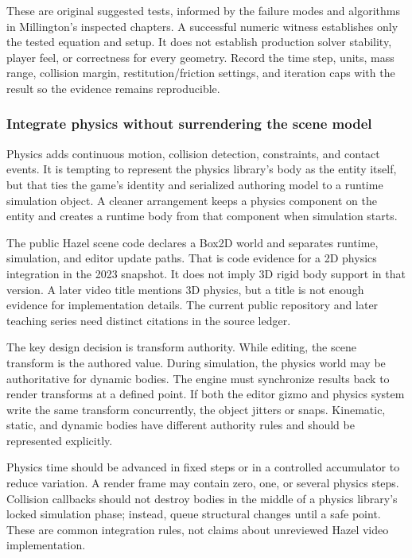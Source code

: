 These are original suggested tests, informed by the failure modes and algorithms in Millington's inspected chapters. A successful numeric witness establishes only the tested equation and setup. It does not establish production solver stability, player feel, or correctness for every geometry. Record the time step, units, mass range, collision margin, restitution/friction settings, and iteration caps with the result so the evidence remains reproducible.

\subsubsection{Integrate physics without surrendering the scene model}\label{integrate-physics-without-surrendering-the-scene-model}

Physics adds continuous motion, collision detection, constraints, and contact events. It is tempting to represent the physics library's body as the entity itself, but that ties the game's identity and serialized authoring model to a runtime simulation object. A cleaner arrangement keeps a physics component on the entity and creates a runtime body from that component when simulation starts.

The public Hazel scene code declares a Box2D world and separates runtime, simulation, and editor update paths. That is code evidence for a 2D physics integration in the 2023 snapshot. It does not imply 3D rigid body support in that version. A later video title mentions 3D physics, but a title is not enough evidence for implementation details. The current public repository and later teaching series need distinct citations in the source ledger.

The key design decision is transform authority. While editing, the scene transform is the authored value. During simulation, the physics world may be authoritative for dynamic bodies. The engine must synchronize results back to render transforms at a defined point. If both the editor gizmo and physics system write the same transform concurrently, the object jitters or snaps. Kinematic, static, and dynamic bodies have different authority rules and should be represented explicitly.

Physics time should be advanced in fixed steps or in a controlled accumulator to reduce variation. A render frame may contain zero, one, or several physics steps. Collision callbacks should not destroy bodies in the middle of a physics library's locked simulation phase; instead, queue structural changes until a safe point. These are common integration rules, not claims about unreviewed Hazel video implementation.

